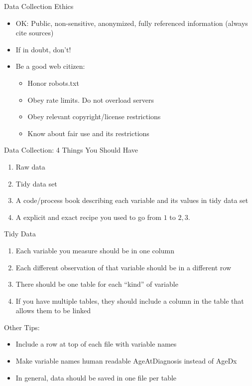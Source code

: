 \documentclass{beamer}
\begin{document}
\begin{frame}{Data Collection Ethics}
    \begin{itemize}
        \item OK: Public, non-sensitive, anonymized, fully referenced information (always cite sources)
        \item If in doubt, don't!
        \item Be a good web citizen: 
        \begin{itemize}
            \item Honor robots.txt
            \item Obey rate limits. Do not overload servers
            \item Obey relevant copyright/license restrictions
            \item Know about fair use and its restrictions
        \end{itemize}
    \end{itemize}
\end{frame}

\begin{frame}{Data Collection: 4 Things You Should Have}
    \begin{enumerate}
        \item Raw data
        \item Tidy data set
        \item A code/process book describing each variable and its values in tidy data set
        \item A explicit and exact recipe you used to go from $1$ to $2,3$.
    \end{enumerate}
\end{frame}


\begin{frame}{Tidy Data}
    \begin{enumerate}
        \item Each variable you measure should be in one column
        \item Each different observation of that variable should be in a different row
        \item There should be one table for each ``kind'' of variable
        \item If you have multiple tables, they should include a column in the table that allows them to be linked
    \end{enumerate}
    Other Tips:
    \begin{itemize}
        \item Include a row at top of each file with variable names
        \item Make variable names human readable AgeAtDiagnosis instead of AgeDx
        \item In general, data should be saved in one file per table
    \end{itemize}
\end{frame}
\end{document}
